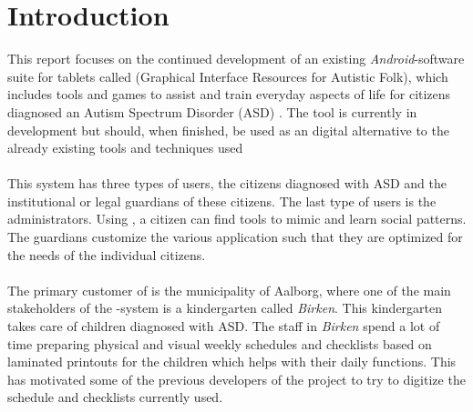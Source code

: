 \chapter{Introduction}
\label{cha:introduction}

This report focuses on the continued development of an existing \emph{Android}-software suite for tablets called \giraf (Graphical Interface Resources for Autistic Folk), which includes tools and games to assist and train everyday aspects of life for citizens diagnosed an Autism Spectrum Disorder (ASD) \parencite{asd}. The tool is currently in development but should, when finished, be used as an digital alternative to the already existing tools and techniques used 
\\\\
This system has three types of users, the citizens diagnosed with ASD and the institutional or legal guardians of these citizens. The last type of users is the administrators. Using \giraf, a citizen can find tools to mimic and learn social patterns. The guardians customize the various application such that they are optimized for the needs of the individual citizens. 
\\\\
The primary customer of \giraf is the municipality of Aalborg, where one of the main stakeholders of the \giraf-system is a kindergarten called \emph{Birken}. This kindergarten takes care of children diagnosed with ASD. The staff in \emph{Birken} spend a lot of time preparing physical and visual weekly schedules and checklists based on laminated printouts for the children which helps with their daily functions. This has motivated some of the previous developers of the \giraf project to try to digitize the schedule and checklists currently used. 



